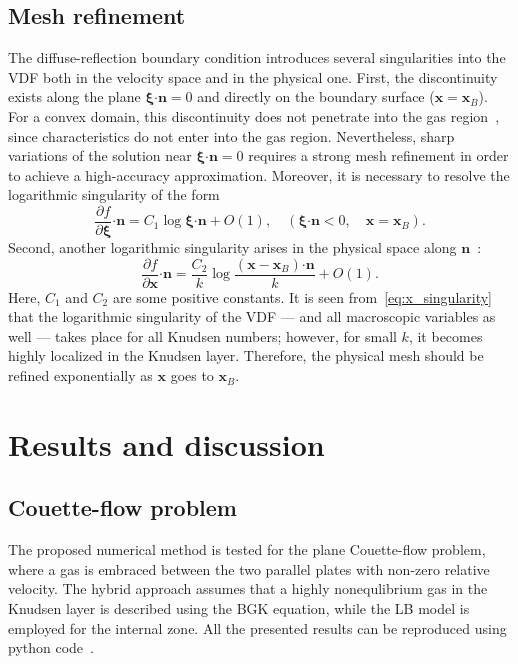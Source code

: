 \documentclass{elsarticle} %
\newcommand{\pder}[2][]{\frac{\partial#1}{\partial#2}}
\newcommand{\OO}[1]{O(#1)}
\newcommand{\bxi}{\boldsymbol{\xi}}
\newcommand{\bn}{\boldsymbol{n}}
\newcommand{\bdot}{\boldsymbol{\cdot}}
\newcommand{\bx}{\boldsymbol{x}}
\begin{document}
\subsection{Mesh refinement}\label{sec:numerics:refinement}

The diffuse-reflection boundary condition introduces several singularities into the VDF
both in the velocity space and in the physical one.
First, the discontinuity exists along the plane \(\bxi\bdot\bn=0\) and directly on the boundary surface (\(\bx=\bx_B\)).
For a convex domain, this discontinuity does not penetrate into the gas region~\cite{Kim2011, Guo2017},
since characteristics do not enter into the gas region.
Nevertheless, sharp variations of the solution near \(\bxi\bdot\bn=0\) requires a strong mesh refinement
in order to achieve a high-accuracy approximation.
Moreover, it is necessary to resolve the logarithmic singularity of the form~\cite{Takata2016}
\begin{equation}\label{eq:xi_singularity}
    \pder[f]{\bxi}\bdot\bn = C_1\log\bxi\bdot\bn + \OO{1}, \quad (\bxi\bdot\bn<0, \quad \bx=\bx_B).
\end{equation}
Second, another logarithmic singularity arises in the physical space along \(\bn\)~\cite{Takata2014}:
\begin{equation}\label{eq:x_singularity}
    \pder[f]{\bx}\bdot\bn = \frac{C_2}{k}\log\frac{(\bx-\bx_B)\bdot\bn}{k} + \OO{1}.
\end{equation}
Here, \(C_1\) and \(C_2\) are some positive constants.
It is seen from~\eqref{eq:x_singularity} that the logarithmic singularity of the VDF
--- and all macroscopic variables as well --- takes place for all Knudsen numbers;
however, for small \(k\), it becomes highly localized in the Knudsen layer.
Therefore, the physical mesh should be refined exponentially as \(\bx\) goes to \(\bx_B\).

\section{Results and discussion}\label{sec:results}

\subsection{Couette-flow problem}

The proposed numerical method is tested for the plane Couette-flow problem,
where a gas is embraced between the two parallel plates with non-zero relative velocity.
The hybrid approach assumes that a highly nonequlibrium gas in the Knudsen layer
is described using the BGK equation, while the LB model is employed for the internal zone.
All the presented results can be reproduced using python code~\cite{Rogozin2019hybrid}.
\end{document}
